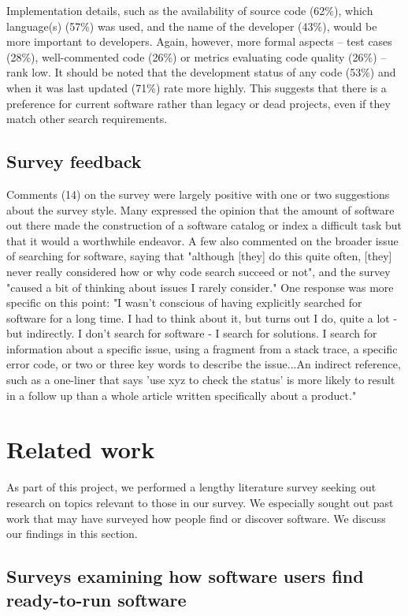 \documentclass{casicswhitepaper}
\begin{document}
Implementation details, such as the availability of source code (62\%), which language(s) (57\%) was used, and the name of the developer (43\%), would be more important to developers. Again, however, more formal aspects -- test cases (28\%), well-commented code (26\%) or metrics evaluating code quality (26\%) -- rank low. It should be noted that the development status of any code (53\%) and when it was last updated (71\%) rate more highly. This suggests that there is a preference for current software rather than legacy or dead projects, even if they match other search requirements.


\subsection{Survey feedback}

Comments (14) on the survey were largely positive with one or two suggestions about the survey style. Many expressed the opinion that the amount of software out there made the construction of a software catalog or index a difficult task but that it would a worthwhile endeavor. A few also commented on the broader issue of searching for software, saying that "although [they] do this quite often, [they] never really considered how or why code search succeed or not", and the survey "caused a bit of thinking about issues I rarely consider." One response was more specific on this point: "I wasn't conscious of having explicitly searched for software for a long time. I had to think about it, but turns out I do, quite a lot - but indirectly. I don't search for software - I search for solutions. I search for information about a specific issue, using a fragment from a stack trace, a specific error code, or two or three key words to describe the issue...An indirect reference, such as a one-liner that says 'use xyz to check the status' is more likely to result in a follow up than a whole article written specifically about a product." 


\section{Related work}

As part of this project, we performed a lengthy literature survey seeking out research on topics relevant to those in our survey.  We especially sought out past work that may have surveyed how people find or discover software.  We discuss our findings in this section.

\subsection{Surveys examining how software users find ready-to-run software}
\end{document}
